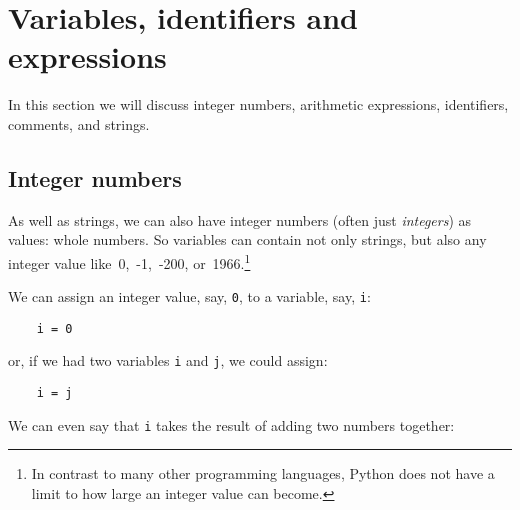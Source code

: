 \section{Variables, identifiers and expressions}

In this section we will discuss integer numbers, arithmetic expressions, 
identifiers, comments, and strings.

\subsection{Integer numbers}

As well as strings, we can also have integer numbers (often just
\emph{integers}) as values: whole numbers.
So variables can contain not only strings, but also any
integer value like~0,~-1,~-200, or~1966.\footnote{In contrast to many
  other programming languages, Python does not have a limit to how
  large an integer value can become.}



We can assign an integer value, say, \verb!0!,
to a variable, say, \verb!i!:

\begin{Verbatim}
    i = 0
\end{Verbatim}



or, if we had two variables \verb!i! and \verb!j!, we could assign:

\begin{Verbatim}
    i = j
\end{Verbatim}

We can even say that \verb.i. takes the result of adding two numbers
together:

